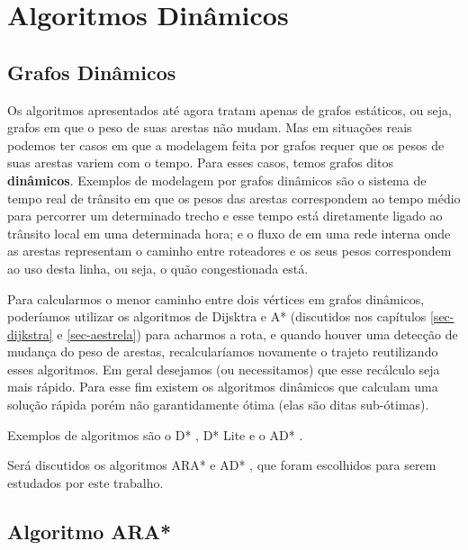 \chapter{Algoritmos Dinâmicos}
\label{sec-dinamicos}

\section{Grafos Dinâmicos}
\label{sec-dinamicos-grafos}
Os algoritmos apresentados até agora tratam apenas de grafos estáticos, ou seja, grafos em que o peso de suas arestas não mudam. Mas em situações reais podemos ter casos em que a modelagem feita por grafos requer que os pesos de suas arestas variem com o tempo. Para esses casos, temos grafos ditos \textbf{dinâmicos}. Exemplos de modelagem por grafos dinâmicos são o sistema de tempo real de trânsito em que os pesos das arestas correspondem ao tempo médio para percorrer um determinado trecho e esse tempo está diretamente ligado ao trânsito local em uma determinada hora; e o fluxo de em uma rede interna onde as arestas representam o caminho entre roteadores e os seus pesos correspondem ao uso desta linha, ou seja, o quão congestionada está.

Para calcularmos o menor caminho entre dois vértices em grafos dinâmicos, poderíamos utilizar os algoritmos de Dijsktra e A* (discutidos nos capítulos \ref{sec-dijkstra} e \ref{sec-aestrela})  para acharmos a rota, e quando houver uma detecção de mudança do peso de arestas, recalcularíamos novamente o trajeto reutilizando esses algoritmos. Em geral desejamos (ou necessitamos) que esse recálculo seja mais rápido. Para esse fim existem os algoritmos dinâmicos que calculam uma solução rápida porém não garantidamente ótima (elas são ditas sub-ótimas).

Exemplos de algoritmos são o D* \cite{stentz1994optimal}, D* Lite \cite{koenig2002d} e o AD* \cite{likhachev2008anytime}.

Será discutidos os algoritmos ARA* e AD* \cite{likhachev2008anytime}, que foram escolhidos para serem estudados por este trabalho.
\section{Algoritmo ARA*}
\label{sec-dinamicos-ara}

